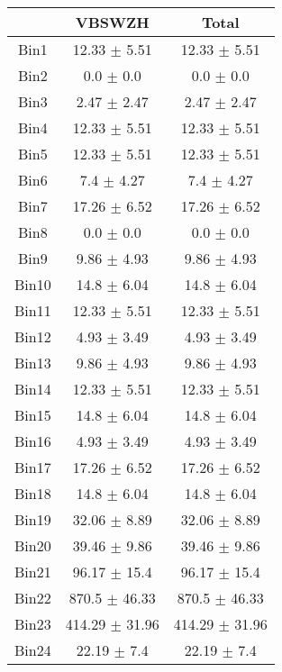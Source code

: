   \begin{tabular}{|c|c|c|}
  \hline
      & VBSWZH & Total \\ \cline{1-3} 
     \hline\hline
     Bin1 & 12.33 $\pm$ 5.51 & 12.33 $\pm$ 5.51 \\ \cline{1-3} 
     Bin2 & 0.0 $\pm$ 0.0 & 0.0 $\pm$ 0.0 \\ \cline{1-3} 
     Bin3 & 2.47 $\pm$ 2.47 & 2.47 $\pm$ 2.47 \\ \cline{1-3} 
     Bin4 & 12.33 $\pm$ 5.51 & 12.33 $\pm$ 5.51 \\ \cline{1-3} 
     Bin5 & 12.33 $\pm$ 5.51 & 12.33 $\pm$ 5.51 \\ \cline{1-3} 
     Bin6 & 7.4 $\pm$ 4.27 & 7.4 $\pm$ 4.27 \\ \cline{1-3} 
     Bin7 & 17.26 $\pm$ 6.52 & 17.26 $\pm$ 6.52 \\ \cline{1-3} 
     Bin8 & 0.0 $\pm$ 0.0 & 0.0 $\pm$ 0.0 \\ \cline{1-3} 
     Bin9 & 9.86 $\pm$ 4.93 & 9.86 $\pm$ 4.93 \\ \cline{1-3} 
     Bin10 & 14.8 $\pm$ 6.04 & 14.8 $\pm$ 6.04 \\ \cline{1-3} 
     Bin11 & 12.33 $\pm$ 5.51 & 12.33 $\pm$ 5.51 \\ \cline{1-3} 
     Bin12 & 4.93 $\pm$ 3.49 & 4.93 $\pm$ 3.49 \\ \cline{1-3} 
     Bin13 & 9.86 $\pm$ 4.93 & 9.86 $\pm$ 4.93 \\ \cline{1-3} 
     Bin14 & 12.33 $\pm$ 5.51 & 12.33 $\pm$ 5.51 \\ \cline{1-3} 
     Bin15 & 14.8 $\pm$ 6.04 & 14.8 $\pm$ 6.04 \\ \cline{1-3} 
     Bin16 & 4.93 $\pm$ 3.49 & 4.93 $\pm$ 3.49 \\ \cline{1-3} 
     Bin17 & 17.26 $\pm$ 6.52 & 17.26 $\pm$ 6.52 \\ \cline{1-3} 
     Bin18 & 14.8 $\pm$ 6.04 & 14.8 $\pm$ 6.04 \\ \cline{1-3} 
     Bin19 & 32.06 $\pm$ 8.89 & 32.06 $\pm$ 8.89 \\ \cline{1-3} 
     Bin20 & 39.46 $\pm$ 9.86 & 39.46 $\pm$ 9.86 \\ \cline{1-3} 
     Bin21 & 96.17 $\pm$ 15.4 & 96.17 $\pm$ 15.4 \\ \cline{1-3} 
     Bin22 & 870.5 $\pm$ 46.33 & 870.5 $\pm$ 46.33 \\ \cline{1-3} 
     Bin23 & 414.29 $\pm$ 31.96 & 414.29 $\pm$ 31.96 \\ \cline{1-3} 
     Bin24 & 22.19 $\pm$ 7.4 & 22.19 $\pm$ 7.4 \\ \cline{1-3} 

\end{tabular}
